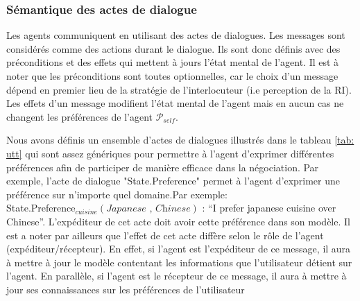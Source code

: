 \documentclass [french]{sig-alternate-05-2015}
\begin{document}
\subsubsection{Sémantique des actes de dialogue}
\par Les agents communiquent en utilisant des actes de dialogues. Les messages sont considérés comme des actions durant le dialogue. Ils sont donc définis avec des préconditions et des effets qui mettent à jours l'état mental de l'agent. Il est à noter que les préconditions sont toutes optionnelles, car le choix d'un message dépend en premier lieu de la stratégie de l'interlocuteur (i.e perception de la RI). Les effets d'un message modifient l'état mental de l'agent  mais en aucun cas ne changent les préférences de l'agent $\mathcal{P}_{self}$. 
\par Nous avons définis un ensemble d'actes de dialogues illustrés dans le tableau \ref{tab: utt} qui sont assez génériques pour permettre à l'agent d'exprimer différentes préférences afin de participer de manière efficace dans la négociation. Par exemple, l'acte de dialogue "State.Preference" permet à l'agent d'exprimer une préférence sur n'importe quel domaine.Par exemple: \\ State.Preference$_{cuisine}(\textit{Japanese , Chinese})$ : ``I prefer japanese cuisine over Chinese''. 
L'expéditeur de cet acte doit avoir cette préférence dans son modèle. Il est a noter par ailleurs que l'effet de cet acte diffère selon le rôle de l'agent (expéditeur/récepteur). En effet, si l'agent est l'expéditeur de ce message, il aura à mettre à jour le modèle contentant les informations que l'utilisateur détient sur l'agent. En parallèle, si l'agent est le récepteur de ce message, il aura à mettre à jour ses connaissances sur les préférences de l'utilisateur
\end{document}
